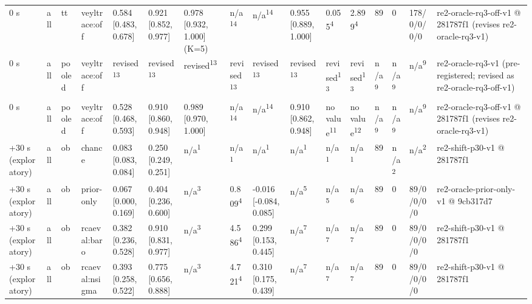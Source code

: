 \begin{table}[t]
\begin{tabular}{llllllllllllllll}
0 s & all & tt & veyltrace:off & 0.584 [0.483, 0.678] & 0.921 [0.852, 0.977] & 0.978 [0.932, 1.000] (K=5) & n/a\textsuperscript{14} & n/a\textsuperscript{14} & 0.955 [0.889, 1.000] & 0.055\textsuperscript{4} & 2.899\textsuperscript{4} & 89 & 0 & 178/0/0/0/0 & re2-oracle-rq3-off-v1 @ 281787f1 (revises re2-oracle-rq3-v1) \\
0 s & all & pooled & veyltrace:off & revised\textsuperscript{13} & revised\textsuperscript{13} & revised\textsuperscript{13} & revised\textsuperscript{13} & revised\textsuperscript{13} & revised\textsuperscript{13} & revised\textsuperscript{13} & revised\textsuperscript{13} & n/a\textsuperscript{9} & n/a\textsuperscript{9} & n/a\textsuperscript{9} & re2-oracle-rq3-v1 (pre-registered; revised as re2-oracle-rq3-off-v1) \\
0 s & all & pooled & veyltrace:off & 0.528 [0.468, 0.593] & 0.910 [0.860, 0.948] & 0.989 [0.970, 1.000] & n/a\textsuperscript{14} & n/a\textsuperscript{14} & 0.910 [0.862, 0.948] & no value\textsuperscript{11} & no value\textsuperscript{12} & n/a\textsuperscript{9} & n/a\textsuperscript{9} & n/a\textsuperscript{9} & re2-oracle-rq3-off-v1 @ 281787f1 (revises re2-oracle-rq3-v1) \\
+30 s (exploratory) & all & ob & chance & 0.083 [0.083, 0.084] & 0.250 [0.249, 0.251] & n/a\textsuperscript{1} & n/a\textsuperscript{1} & n/a\textsuperscript{1} & n/a\textsuperscript{1} & n/a\textsuperscript{1} & n/a\textsuperscript{1} & 89 & n/a\textsuperscript{2} & n/a\textsuperscript{2} & re2-shift-p30-v1 @ 281787f1 \\
+30 s (exploratory) & all & ob & prior-only & 0.067 [0.000, 0.169] & 0.404 [0.236, 0.600] & n/a\textsuperscript{3} & 0.809\textsuperscript{4} & -0.016 [-0.084, 0.085] & n/a\textsuperscript{5} & n/a\textsuperscript{5} & n/a\textsuperscript{6} & 89 & 0 & 89/0/0/0/0 & re2-oracle-prior-only-v1 @ 9cb317d7 \\
+30 s (exploratory) & all & ob & rcaeval:baro & 0.382 [0.236, 0.528] & 0.910 [0.831, 0.977] & n/a\textsuperscript{3} & 4.586\textsuperscript{4} & 0.299 [0.153, 0.445] & n/a\textsuperscript{7} & n/a\textsuperscript{7} & n/a\textsuperscript{7} & 89 & 0 & 89/0/0/0/0 & re2-shift-p30-v1 @ 281787f1 \\
+30 s (exploratory) & all & ob & rcaeval:nsigma & 0.393 [0.258, 0.522] & 0.775 [0.656, 0.888] & n/a\textsuperscript{3} & 4.721\textsuperscript{4} & 0.310 [0.175, 0.439] & n/a\textsuperscript{7} & n/a\textsuperscript{7} & n/a\textsuperscript{7} & 89 & 0 & 89/0/0/0/0 & re2-shift-p30-v1 @ 281787f1 \\

\end{tabular}
\end{table}
